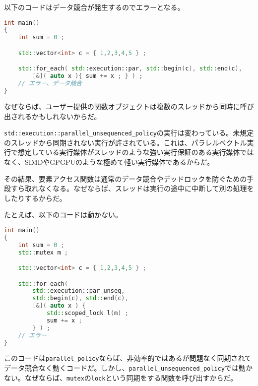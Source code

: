 以下のコードはデータ競合が発生するのでエラーとなる。

\begin{lstlisting}[language=C++]
int main()
{
    int sum = 0 ;

    std::vector<int> c = { 1,2,3,4,5 } ;

    std::for_each( std::execution::par, std::begin(c), std::end(c),
        [&]( auto x ){ sum += x ; } ) ;
    // エラー、データ競合
}
\end{lstlisting}

なぜならば、ユーザー提供の関数オブジェクトは複数のスレッドから同時に呼び出されるかもしれないからだ。

\lstinline!std::execution::parallel_unsequenced_policy!の実行は変わっている。未規定のスレッドから同期されない実行が許されている。これは、パラレルベクトル実行で想定している実行媒体がスレッドのような強い実行保証のある実行媒体ではなく、SIMDやGPGPUのような極めて軽い実行媒体であるからだ。

その結果、要素アクセス関数は通常のデータ競合やデッドロックを防ぐための手段すら取れなくなる。なぜならば、スレッドは実行の途中に中断して別の処理をしたりするからだ。

たとえば、以下のコードは動かない。

\begin{lstlisting}[language=C++]
int main()
{
    int sum = 0 ;
    std::mutex m ;

    std::vector<int> c = { 1,2,3,4,5 } ;

    std::for_each(
        std::execution::par_unseq,
        std::begin(c), std::end(c),
        [&]( auto x ) {
            std::scoped_lock l(m) ;
            sum += x ; 
        } ) ;
    // エラー
}
\end{lstlisting}

このコードは\lstinline!parallel_policy!ならば、非効率的ではあるが問題なく同期されてデータ競合なく動くコードだ。しかし、\lstinline!parallel_unsequenced_policy!では動かない。なぜならば、\lstinline!mutex!の\lstinline!lock!という同期をする関数を呼び出すからだ。

